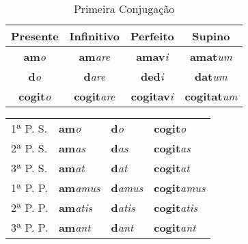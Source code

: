 \documentclass{book}
\newcommand{\radicaldesinencia}[2]{\textbf{#1}\textit{#2}}
\begin{document}
\begin{table}
\centering
\caption{Primeira Conjugação}
\vspace{0.2cm}
\begin{tabular}{c|c|c|c}
\hline
Presente		&	Infinitivo		&	Perfeito		&	Supino	\\
\hline                                    		
\radicaldesinencia{am}{o}	&	\radicaldesinencia{am}{are}	&	\radicaldesinencia{amav}{i}	&	\radicaldesinencia{amat}{um}	\\
\radicaldesinencia{d}{o}	&	\radicaldesinencia{d}{are}	&	\radicaldesinencia{ded}{i}	&	\radicaldesinencia{dat}{um}	\\
\radicaldesinencia{cogit}{o}	&	\radicaldesinencia{cogit}{are}	&	\radicaldesinencia{cogitav}{i}	&	\radicaldesinencia{cogitat}{um}	\\
 \hline
\end{tabular}
\end{table}

\begin{table}
\centering
\begin{tabular}{l|l|l|l}
\hline
1ª P. S.	&  \radicaldesinencia{am}{o}		& \radicaldesinencia{d}{o}		& \radicaldesinencia{cogit}{o} \\
2ª P. S.	&  \radicaldesinencia{am}{as} 	& \radicaldesinencia{d}{as}		& \radicaldesinencia{cogit}{as} \\
3ª P. S.	&  \radicaldesinencia{am}{at} 	& \radicaldesinencia{d}{at}		& \radicaldesinencia{cogit}{at} \\
\hline
\hline
1ª P. P.	&  \radicaldesinencia{am}{amus} 	& \radicaldesinencia{d}{amus}	& \radicaldesinencia{cogit}{amus} \\
2ª P. P. 	&  \radicaldesinencia{am}{atis} 	& \radicaldesinencia{d}{atis} 	& \radicaldesinencia{cogit}{atis} \\
3ª P. P.	&  \radicaldesinencia{am}{ant} 	& \radicaldesinencia{d}{ant}		& \radicaldesinencia{cogit}{ant} \\ 
\hline
\end{tabular}
\end{table}
\clearpage
\end{document}
